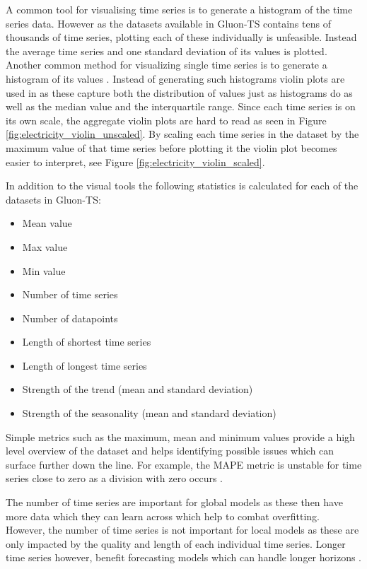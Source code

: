 A common tool for visualising time series is to generate a histogram of the time series data. However as the datasets available in Gluon-TS contains tens of thousands of time series, plotting each of these individually is unfeasible. Instead the average time series and one standard deviation of its values is plotted. Another common method for visualizing single time series is to generate a histogram of its values \cite{hyndman_forecasting_3rd}. Instead of generating such histograms violin plots are used in as these capture both the distribution of values just as histograms do as well as the median value and the interquartile range. Since each time series is on its own scale, the aggregate violin plots are hard to read as seen in Figure \ref{fig:electricity_violin_unscaled}. By scaling each time series in the dataset by the maximum value of that time series before plotting it the violin plot becomes easier to interpret, see Figure \ref{fig:electricity_violin_scaled}.

In addition to the visual tools the following statistics is calculated for each of the datasets in Gluon-TS:

\begin{itemize}
  \item Mean value
  \item Max value
  \item Min value
  \item Number of time series
  \item Number of datapoints
  \item Length of shortest time series
  \item Length of longest time series
  \item Strength of the trend (mean and standard deviation)
  \item Strength of the seasonality (mean and standard deviation)
\end{itemize}

Simple metrics such as the maximum, mean and minimum values provide a high level overview of the dataset and helps identifying possible issues which can surface further down the line. For example, the MAPE metric is unstable for time series close to zero as a division with zero occurs \cite{goodwin_asymmetry_1999}.

The number of time series are important for global models as these then have more data which they can learn across which help to combat overfitting. However, the number of time series is not important for local models as these are only impacted by the quality and length of each individual time series. Longer time series however, benefit forecasting models which can handle longer horizons \cite{makridakis_m4_2020}.

